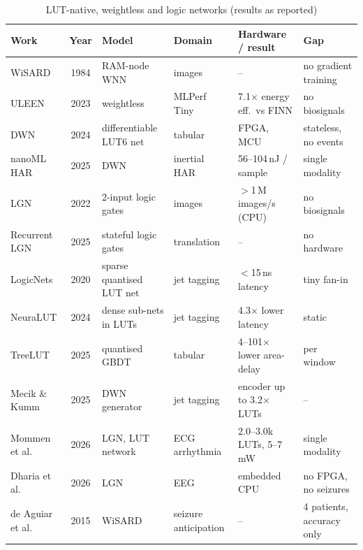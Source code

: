 \begin{table}[H]
\centering\small
\caption{LUT-native, weightless and logic networks (results as reported)}\label{tab:lit-lut}
\begin{tabularx}{\textwidth}{|P{30mm}|c|P{27mm}|P{22mm}|L|L|}
\toprule
\textbf{Work} & \textbf{Year} & \textbf{Model} & \textbf{Domain} & \textbf{Hardware / result} & \textbf{Gap}\\
\midrule
WiSARD \cite{aleksander1984wisard} & 1984 & RAM-node WNN & images & -- & no gradient training\\ \hline
ULEEN \cite{susskind2023uleen} & 2023 & weightless & MLPerf Tiny & 7.1$\times$ energy eff.\ vs FINN & no biosignals\\ \hline
DWN \cite{bacellar2024dwn} & 2024 & differentiable LUT6 net & tabular & FPGA, MCU & stateless, no events\\ \hline
nanoML HAR \cite{bacellar2025nanoml} & 2025 & DWN & inertial HAR & 56--104\,nJ / sample & single modality\\ \hline
LGN \cite{petersen2022dlgn} & 2022 & 2-input logic gates & images & $>$1\,M images/s (CPU) & no biosignals\\ \hline
Recurrent LGN \cite{buhrer2025rdlgn} & 2025 & stateful logic gates & translation & -- & no hardware\\ \hline
LogicNets \cite{umuroglu2020logicnets} & 2020 & sparse quantised LUT net & jet tagging & $<$15\,ns latency & tiny fan-in\\ \hline
NeuraLUT \cite{andronic2024neuralut} & 2024 & dense sub-nets in LUTs & jet tagging & 4.3$\times$ lower latency & static\\ \hline
TreeLUT \cite{khataei2025treelut} & 2025 & quantised GBDT & tabular & 4--101$\times$ lower area-delay & per window\\ \hline
Mecik \& Kumm \cite{mecik2025thermo} & 2025 & DWN generator & jet tagging & encoder up to 3.2$\times$ LUTs & --\\ \hline
Mommen et al. \cite{mommen2026ecg} & 2026 & LGN, LUT network & ECG arrhythmia & 2.0--3.0k LUTs, 5--7\,mW & single modality\\ \hline
Dharia et al. \cite{dharia2026eeglgn} & 2026 & LGN & EEG & embedded CPU & no FPGA, no seizures\\ \hline
de Aguiar et al. \cite{deaguiar2015wisard} & 2015 & WiSARD & seizure anticipation & -- & 4 patients, accuracy only\\ \hline

\end{tabularx}
\end{table}

